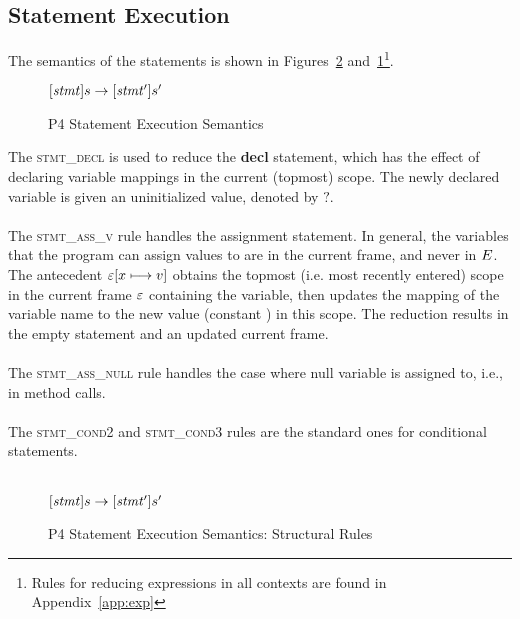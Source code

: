 \documentclass[UTF8]{article}
\begin{document}
   
\subsection{Statement Execution}
The semantics of the statements is shown in Figures~\ref{fig:strsemstmtexec} and~\ref{fig:semstmtexec}\footnote{Rules for reducing expressions in all contexts are found in Appendix~\ref{app:exp}}.

\begin{figure}[ht!]
\begin{ottdefnblock}{$[  \mathit{stmt}  ]  s  \rightarrow  [  \mathit{stmt'}  ]  s'$}{}
\ottusedrule{\ottdrulestmtXXdecl{}}
\ottusedrule{\ottdrulestmtXXassXXv{}}
\ottusedrule{\ottdrulestmtXXassXXnull{}}
\ottusedrule{\ottdrulestmtXXcondTwo{}}
\ottusedrule{\ottdrulestmtXXcondThree{}}
\end{ottdefnblock}
\caption{P4 Statement Execution Semantics}
\label{fig:semstmtexec}
\end{figure}
The \textsc{stmt\_decl} is used to reduce the \textbf{decl} statement, which has the effect of declaring variable mappings in the current (topmost) scope. The newly declared variable is given an uninitialized value, denoted by $?$.
\\~\\
The \textsc{stmt\_ass\_v} rule handles the assignment statement. In general, the variables that the program can assign values to are in the current frame, and never in $E$. The antecedent $\varepsilon [ x \longmapsto v ]$ obtains the topmost (i.e. most recently entered) scope in the current frame $\varepsilon$ containing the variable, then updates the mapping of the variable name \vn{} to the new value (constant \cval{}) in this scope. The reduction results in the empty statement and an updated current frame.
\\~\\
The \textsc{stmt\_ass\_null} rule handles the case where null variable is assigned to, i.e., in method calls.
\\~\\
The \textsc{stmt\_cond2} and \textsc{stmt\_cond3} rules are the standard ones for conditional statements.
\\~\\

\begin{figure}[ht!]
\begin{ottdefnblock}{$[  \mathit{stmt}  ]  s  \rightarrow  [  \mathit{stmt'}  ]  s'$}{}
\ottusedrule{\ottdrulestmtXXseqOne{}}
\ottusedrule{\ottdrulestmtXXseqTwo{}}
\ottusedrule{\ottdrulestmtXXblockXXenter{}}
\ottusedrule{\ottdrulestmtXXblockXXexec{}}
\ottusedrule{\ottdrulestmtXXblockXXexit{}}
\end{ottdefnblock}
\caption{P4 Statement Execution Semantics: Structural Rules}
\label{fig:strsemstmtexec}
\end{figure}
\end{document}
